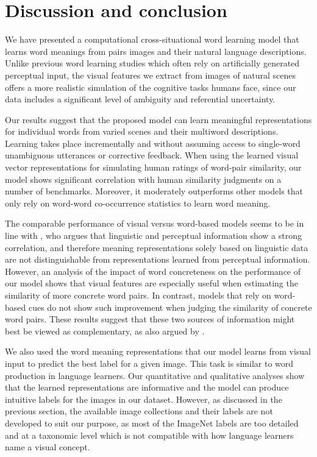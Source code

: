 \section{Discussion and conclusion}
\label{sec:discussion}

We have presented a computational cross-situational word
learning model that learns word meanings from pairs
images and their natural language descriptions. Unlike
previous word learning studies which often rely on artificially
generated perceptual input, the visual features we extract from images
of natural scenes offers a more realistic simulation of the cognitive
tasks humans face, since our data includes a significant level of
ambiguity and referential uncertainty.

Our results suggest that the proposed model can learn meaningful
representations for individual words from varied scenes and their
multiword descriptions. Learning takes place incrementally and without
assuming access to single-word unambiguous utterances or corrective
feedback.  When using the learned visual vector representations for
simulating human ratings of word-pair similarity, our model shows
significant correlation with human similarity judgments on a number of
benchmarks. Moreover, it moderately outperforms other models that only
rely on word-word co-occurrence statistics to learn word meaning.

The comparable performance of visual versus word-based models seems to
be in line with \citep{louwerse2011symbol}, who argues that linguistic
and perceptual information show a strong correlation, and therefore
meaning representations solely based on linguistic data are not
distinguishable from representations learned from perceptual
information. However, an analysis of the impact of word concreteness
on the performance of our model shows that visual features are
especially useful when estimating the similarity of more concrete word
pairs. In contrast, models that rely on word-based cues do not show such improvement
when judging the similarity of concrete word pairs. These results
suggest that these two sources of information might best be viewed as
complementary, as also argued by \citep{bruni2014multimodal}.

We also used the word meaning representations that our model learns
from visual input to predict the best label for a given image. This
task is similar to word production in language learners. Our
quantitative and qualitative analyses show that the learned
representations are informative and the model can produce intuitive
labels for the images in our dataset. However, as discussed in the
previous section, the available image collections and their labels
are not developed to suit our purpose, as most of the ImageNet
labels are too detailed and at a taxonomic level which is not
compatible with how language learners name a visual concept.

